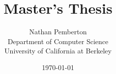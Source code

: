 \documentclass[12pt]{article}
\title{Master's Thesis}
\author{
        Nathan Pemberton \\
                Department of Computer Science \\
                University of California at Berkeley
}
\date{\today}
\begin{document}
\maketitle

\newpage



\newpage
\tableofcontents
\newpage



\listoftodos



\end{document}

